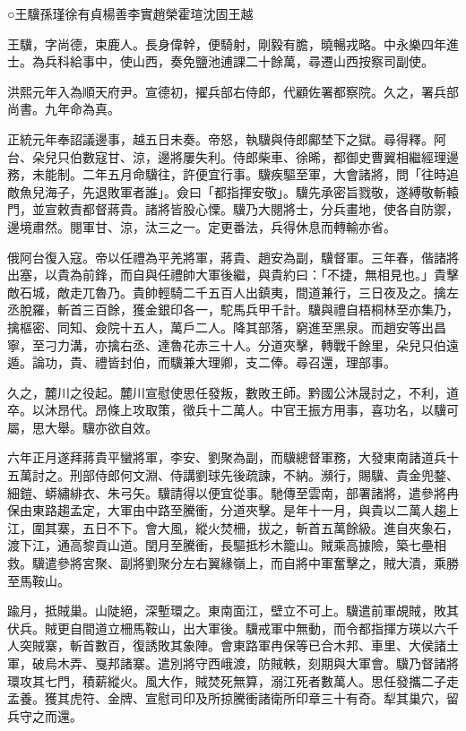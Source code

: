 
\begin{pinyinscope}
○王驥孫瑾徐有貞楊善李實趙榮霍瑄沈固王越

王驥，字尚德，束鹿人。長身偉幹，便騎射，剛毅有膽，曉暢戎略。中永樂四年進士。為兵科給事中，使山西，奏免鹽池逋課二十餘萬，尋遷山西按察司副使。

洪熙元年入為順天府尹。宣德初，擢兵部右侍郎，代顧佐署都察院。久之，署兵部尚書。九年命為真。

正統元年奉詔議邊事，越五日未奏。帝怒，執驥與侍郎鄺埜下之獄。尋得釋。阿台、朵兒只伯數寇甘、涼，邊將屢失利。侍郎柴車、徐晞，都御史曹翼相繼經理邊務，未能制。二年五月命驥往，許便宜行事。驥疾驅至軍，大會諸將，問「往時追敵魚兒海子，先退敗軍者誰」。僉曰「都指揮安敬」。驥先承密旨戮敬，遂縛敬斬轅門，並宣敕責都督蔣貴。諸將皆股心慄。驥乃大閱將士，分兵畫地，使各自防禦，邊境肅然。閱軍甘、涼，汰三之一。定更番法，兵得休息而轉輸亦省。

俄阿台復入寇。帝以任禮為平羌將軍，蔣貴、趙安為副，驥督軍。三年春，偕諸將出塞，以貴為前鋒，而自與任禮帥大軍後繼，與貴約曰：「不捷，無相見也。」貴擊敵石城，敵走兀魯乃。貴帥輕騎二千五百人出鎮夷，間道兼行，三日夜及之。擒左丞脫羅，斬首三百餘，獲金銀印各一，駝馬兵甲千計。驥與禮自梧桐林至亦集乃，擒樞密、同知、僉院十五人，萬戶二人。降其部落，窮進至黑泉。而趙安等出昌寧，至刁力溝，亦擒右丞、達魯花赤三十人。分道夾擊，轉戰千餘里，朵兒只伯遠遁。論功，貴、禮皆封伯，而驥兼大理卿，支二俸。尋召還，理部事。

久之，麓川之役起。麓川宣慰使思任發叛，數敗王師。黔國公沐晟討之，不利，道卒。以沐昂代。昂條上攻取策，徵兵十二萬人。中官王振方用事，喜功名，以驥可屬，思大舉。驥亦欲自效。

六年正月遂拜蔣貴平蠻將軍，李安、劉聚為副，而驥總督軍務，大發東南諸道兵十五萬討之。刑部侍郎何文淵、侍講劉球先後疏諫，不納。瀕行，賜驥、貴金兜鍪、細鎧、蟒繡緋衣、朱弓矢。驥請得以便宜從事。馳傳至雲南，部署諸將，遣參將冉保由東路趨孟定，大軍由中路至騰衝，分道夾擊。是年十一月，與貴以二萬人趨上江，圍其寨，五日不下。會大風，縱火焚柵，拔之，斬首五萬餘級。進自夾象石，渡下江，通高黎貢山道。閏月至騰衝，長驅抵杉木籠山。賊乘高據險，築七壘相救。驥遣參將宮聚、副將劉聚分左右翼緣嶺上，而自將中軍奮擊之，賊大潰，乘勝至馬鞍山。

踰月，抵賊巢。山陡絕，深塹環之。東南面江，壁立不可上。驥遣前軍覘賊，敗其伏兵。賊更自間道立柵馬鞍山，出大軍後。驥戒軍中無動，而令都指揮方瑛以六千人突賊寨，斬首數百，復誘敗其象陣。會東路軍冉保等已合木邦、車里、大侯諸土軍，破烏木弄、戛邦諸寨。遣別將守西峨渡，防賊軼，刻期與大軍會。驥乃督諸將環攻其七門，積薪縱火。風大作，賊焚死無算，溺江死者數萬人。思任發攜二子走孟養。獲其虎符、金牌、宣慰司印及所掠騰衝諸衛所印章三十有奇。犁其巢穴，留兵守之而還。


\end{pinyinscope}
